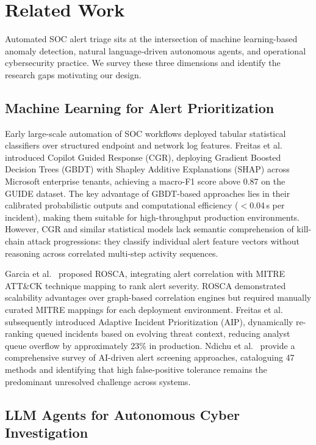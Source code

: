 \section{Related Work}
\label{sec:related}

Automated SOC alert triage sits at the intersection of machine learning-based
anomaly detection, natural language-driven autonomous agents, and operational
cybersecurity practice. We survey these three dimensions and identify the research
gaps motivating our design.

\subsection{Machine Learning for Alert Prioritization}

Early large-scale automation of SOC workflows deployed tabular statistical
classifiers over structured endpoint and network log features.
Freitas et al.~\cite{freitas2024cgr} introduced Copilot Guided Response (CGR),
deploying Gradient Boosted Decision Trees (GBDT) with Shapley Additive Explanations
(SHAP) across Microsoft enterprise tenants, achieving a macro-F1 score above 0.87
on the GUIDE dataset. The key advantage of GBDT-based approaches lies in their
calibrated probabilistic outputs and computational efficiency ($<$0.04\,s per
incident), making them suitable for high-throughput production environments.
However, CGR and similar statistical models lack semantic comprehension of
kill-chain attack progressions: they classify individual alert feature vectors
without reasoning across correlated multi-step activity sequences.

Garcia et al.~\cite{garcia2025rosca} proposed ROSCA, integrating alert correlation
with MITRE ATT\&CK technique mapping to rank alert severity. ROSCA demonstrated
scalability advantages over graph-based correlation engines but required manually
curated MITRE mappings for each deployment environment.
Freitas et al.~\cite{freitas2026aip} subsequently introduced Adaptive Incident
Prioritization (AIP), dynamically re-ranking queued incidents based on evolving
threat context, reducing analyst queue overflow by approximately 23\% in production.
Ndichu et al.~\cite{ndichu2026survey} provide a comprehensive survey of AI-driven
alert screening approaches, cataloguing 47 methods and identifying that high
false-positive tolerance remains the predominant unresolved challenge across systems.

\subsection{LLM Agents for Autonomous Cyber Investigation}

